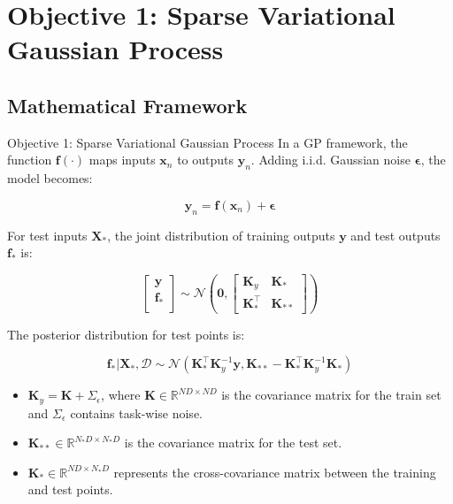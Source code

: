 \section*{Objective 1: Sparse Variational Gaussian Process}

\subsection{Mathematical Framework}

\begin{frame}{Objective 1: Sparse Variational Gaussian Process}
	In a GP framework, the function $\bm{f}(\cdot)$ maps inputs $\bm{x}_n$ to outputs $\bm{y}_n$. Adding i.i.d. Gaussian noise $\bm{\epsilon}$, the model becomes:
	
	\[
	\bm{y}_n = \bm{f}(\bm{x}_n) + \bm{\epsilon}
	\]
	
	For test inputs $\mathbf{X}_*$, the joint distribution of training outputs $\mathbf{y}$ and test outputs $\mathbf{f}_*$ is:
	
	\[
	\left[ \begin{array}{c}
		\mathbf{y}\\
		\mathbf{f_*}\\
	\end{array}
	\right] \sim \mathcal{N} \left( \bm{0}, \left[
	\begin{array}{cc}
		\mathbf{K}_y & \mathbf{K}_* \\
		\mathbf{K}_*^\top & \mathbf{K}_{**}
	\end{array}\right] \right)
	\]
	
	The posterior distribution for test points is:
	
	\[
	\mathbf{f}_* | \mathbf{X}_*, \mathcal{D} \sim \mathcal{N}(\mathbf{K}_*^\top \mathbf{K}_y^{-1} \mathbf{y}, \mathbf{K}_{**} - \mathbf{K}_*^\top \mathbf{K}_y^{-1} \mathbf{K}_*)
	\]
	
	\begin{itemize}
		\item $\mathbf{K}_y = \mathbf{K} + \Sigma_\epsilon$, where $\mathbf{K} \in \mathbb{R}^{ND \times ND}$ is the covariance matrix for the train set and $\Sigma_\epsilon$ contains task-wise noise.
		
		\item $\mathbf{K}_{**} \in \mathbb{R}^{N_* D \times N_* D}$ is the covariance matrix for the test set.
		
		\item $\mathbf{K}_* \in \mathbb{R}^{ND \times N_* D}$ represents the cross-covariance matrix between the training and test points.
	\end{itemize}
	
\end{frame}


